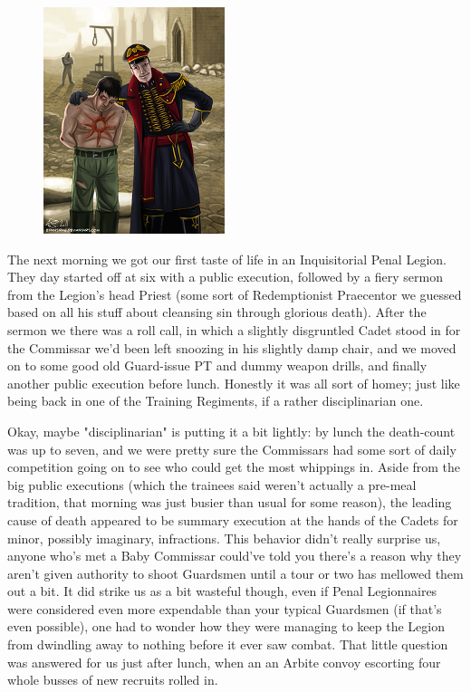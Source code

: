 \begin{figure}
	\begin{center}
		\includegraphics[width=\figwidth]{pics/21/18.png}
	\end{center}
\end{figure}
The next morning we got our first taste of life in an Inquisitorial Penal Legion. 
They day started off at six with a public execution, followed by a fiery sermon from the Legion's head Priest (some sort of Redemptionist Praecentor we guessed based on all his stuff about cleansing sin through glorious death). 
After the sermon we there was a roll call, in which a slightly disgruntled Cadet stood in for the Commissar we'd been left snoozing in his slightly damp chair, and we moved on to some good old Guard-issue PT and dummy weapon drills, and finally another public execution before lunch. 
Honestly it was all sort of homey; 
just like being back in one of the Training Regiments, if a rather disciplinarian one.

Okay, maybe "disciplinarian" is putting it a bit lightly: 
by lunch the death-count was up to seven, and we were pretty sure the Commissars had some sort of daily competition going on to see who could get the most whippings in. 
Aside from the big public executions (which the trainees said weren't actually a pre-meal tradition, that morning was just busier than usual for some reason), the leading cause of death appeared to be summary execution at the hands of the Cadets for minor, possibly imaginary, infractions. 
This behavior didn't really surprise us, anyone who's met a Baby Commissar could've told you there's a reason why they aren't given authority to shoot Guardsmen until a tour or two has mellowed them out a bit. 
It did strike us as a bit wasteful though, even if Penal Legionnaires were considered even more expendable than your typical Guardsmen (if that's even possible), one had to wonder how they were managing to keep the Legion from dwindling away to nothing before it ever saw combat. 
That little question was answered for us just after lunch,  when an an Arbite convoy escorting four whole busses of new recruits rolled in.

